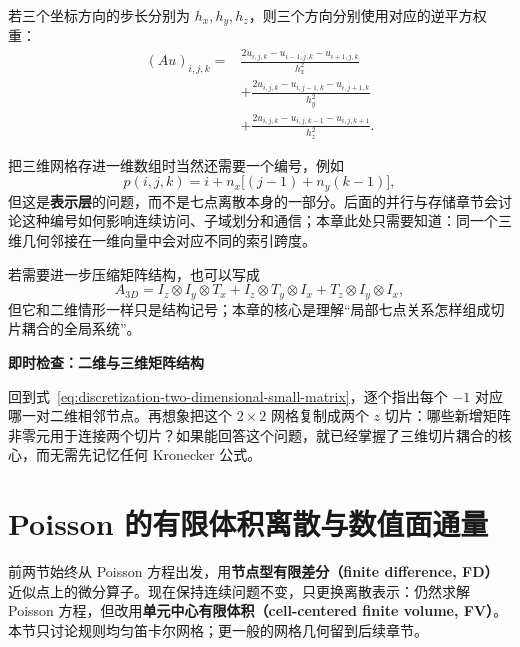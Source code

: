 若三个坐标方向的步长分别为 $h_x,h_y,h_z$，则三个方向分别使用对应的逆平方权重：
\begin{align}
(Au)_{i,j,k}
={}&\frac{2u_{i,j,k}-u_{i-1,j,k}-u_{i+1,j,k}}{h_x^2}\\
&+\frac{2u_{i,j,k}-u_{i,j-1,k}-u_{i,j+1,k}}{h_y^2}\\
&+\frac{2u_{i,j,k}-u_{i,j,k-1}-u_{i,j,k+1}}{h_z^2}.
\label{eq:discretization-three-dimensional-rectangular-grid}
\end{align}

把三维网格存进一维数组时当然还需要一个编号，例如
\begin{equation}
p(i,j,k)=i+n_x\bigl[(j-1)+n_y(k-1)\bigr],
\label{eq:discretization-three-dimensional-indexing}
\end{equation}
但这是\textbf{表示层}的问题，而不是七点离散本身的一部分。后面的并行与存储章节会讨论这种编号如何影响连续访问、子域划分和通信；本章此处只需要知道：同一个三维几何邻接在一维向量中会对应不同的索引跨度。

若需要进一步压缩矩阵结构，也可以写成
\begin{equation}
A_{3D}
=I_z\otimes I_y\otimes T_x
+I_z\otimes T_y\otimes I_x
+T_z\otimes I_y\otimes I_x,
\label{eq:discretization-three-dimensional-kronecker}
\end{equation}
但它和二维情形一样只是结构记号；本章的核心是理解“局部七点关系怎样组成切片耦合的全局系统”。

\begin{checkpointbox}
\textbf{即时检查：二维与三维矩阵结构}

回到式~\eqref{eq:discretization-two-dimensional-small-matrix}，逐个指出每个 $-1$ 对应哪一对二维相邻节点。再想象把这个 $2\times2$ 网格复制成两个 $z$ 切片：哪些新增矩阵非零元用于连接两个切片？如果能回答这个问题，就已经掌握了三维切片耦合的核心，而无需先记忆任何 Kronecker 公式。
\end{checkpointbox}




\section{Poisson 的有限体积离散与数值面通量}
\label{sec:discretization-finite-volume}

前两节始终从 Poisson 方程出发，用\textbf{节点型有限差分（finite difference, FD）}近似点上的微分算子。现在保持连续问题不变，只更换离散表示：仍然求解 Poisson 方程，但改用\textbf{单元中心有限体积（cell-centered finite volume, FV）}。本节只讨论规则均匀笛卡尔网格；更一般的网格几何留到后续章节。

